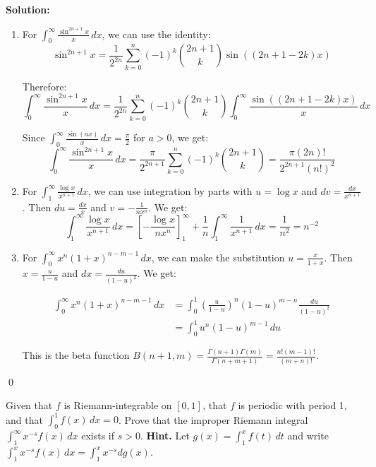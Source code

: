 \bigskip\noindent\textbf{Solution:}
\begin{enumerate}[label=(\alph*)]
\item For $\int_{0}^{\infty} \frac{\sin^{2n+1} x}{x} \, dx$, we can use the identity:
\[\sin^{2n+1} x = \frac{1}{2^{2n}} \sum_{k=0}^{n} (-1)^k \binom{2n+1}{k} \sin((2n+1-2k)x)\]

Therefore:
\[\int_{0}^{\infty} \frac{\sin^{2n+1} x}{x} \, dx = \frac{1}{2^{2n}} \sum_{k=0}^{n} (-1)^k \binom{2n+1}{k} \int_{0}^{\infty} \frac{\sin((2n+1-2k)x)}{x} \, dx\]

Since $\int_{0}^{\infty} \frac{\sin(ax)}{x} \, dx = \frac{\pi}{2}$ for $a > 0$, we get:
\[\int_{0}^{\infty} \frac{\sin^{2n+1} x}{x} \, dx = \frac{\pi}{2^{2n+1}} \sum_{k=0}^{n} (-1)^k \binom{2n+1}{k} = \frac{\pi(2n)!}{2^{2n+1}(n!)^2}\]

\item For $\int_{1}^{\infty} \frac{\log x}{x^{n+1}} \, dx$, we can use integration by parts with $u = \log x$ and $dv = \frac{dx}{x^{n+1}}$. Then $du = \frac{dx}{x}$ and $v = -\frac{1}{nx^n}$. We get:
\[\int_{1}^{\infty} \frac{\log x}{x^{n+1}} \, dx = \left[-\frac{\log x}{nx^n}\right]_{1}^{\infty} + \frac{1}{n} \int_{1}^{\infty} \frac{1}{x^{n+1}} \, dx = \frac{1}{n^2} = n^{-2}\]

\item For $\int_{0}^{\infty} x^n (1 + x)^{n-m-1} \, dx$, we can make the substitution $u = \frac{x}{1+x}$. Then $x = \frac{u}{1-u}$ and $dx = \frac{du}{(1-u)^2}$. We get:

\begin{align*}
\int_{0}^{\infty} x^n (1 + x)^{n-m-1} \, dx &= \int_{0}^{1} \left(\frac{u}{1-u}\right)^n (1-u)^{m-n} \frac{du}{(1-u)^2} \\
&= \int_{0}^{1} u^n (1-u)^{m-1} \, du
\end{align*}

This is the beta function $B(n+1, m) = \frac{\Gamma(n+1)\Gamma(m)}{\Gamma(n+m+1)} = \frac{n!(m-1)!}{(m+n)!}$.
\end{enumerate}\qed


\begin{problembox}
Given that $f$ is Riemann-integrable on $[0, 1]$, that $f$ is periodic with period 1, and that $\int_{0}^{1} f(x) \, dx = 0$. Prove that the improper Riemann integral $\int_{1}^{\infty} x^{-s} f(x) \, dx$ exists if $s > 0$. \textbf{Hint.} Let $g(x) = \int_{1}^{x} f(t) \, dt$ and write $\int_{1}^{x} x^{-s} f(x) \, dx = \int_{1}^{x} x^{-s} dg(x)$.
\end{problembox}

